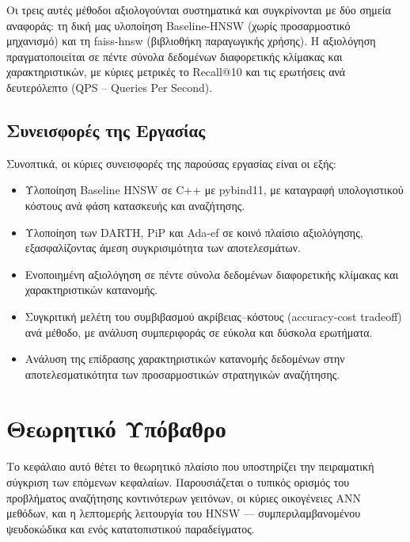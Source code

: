 \documentclass[12pt,a4paper]{article}
\begin{document}
Οι τρεις αυτές μέθοδοι αξιολογούνται συστηματικά και συγκρίνονται με δύο σημεία αναφοράς: τη δική μας υλοποίηση Baseline-HNSW (χωρίς προσαρμοστικό μηχανισμό) και τη faiss-hnsw \cite{faiss2017} (βιβλιοθήκη παραγωγικής χρήσης). Η αξιολόγηση πραγματοποιείται σε πέντε σύνολα δεδομένων διαφορετικής κλίμακας και χαρακτηριστικών, με κύριες μετρικές το Recall@10 και τις ερωτήσεις ανά δευτερόλεπτο (QPS -- Queries Per Second).

\subsection{Συνεισφορές της Εργασίας}
Συνοπτικά, οι κύριες συνεισφορές της παρούσας εργασίας είναι οι εξής:
\begin{itemize}
    \item Υλοποίηση Baseline HNSW σε C++ με pybind11, με καταγραφή υπολογιστικού κόστους ανά φάση κατασκευής και αναζήτησης.
    \item Υλοποίηση των DARTH, PiP και Ada-ef σε κοινό πλαίσιο αξιολόγησης, εξασφαλίζοντας άμεση συγκρισιμότητα των αποτελεσμάτων.
    \item Ενοποιημένη αξιολόγηση σε πέντε σύνολα δεδομένων διαφορετικής κλίμακας και χαρακτηριστικών κατανομής.
    \item Συγκριτική μελέτη του συμβιβασμού ακρίβειας--κόστους (accuracy-cost tradeoff) ανά μέθοδο, με ανάλυση συμπεριφοράς σε εύκολα και δύσκολα ερωτήματα.
    \item Ανάλυση της επίδρασης χαρακτηριστικών κατανομής δεδομένων στην αποτελεσματικότητα των προσαρμοστικών στρατηγικών αναζήτησης.
\end{itemize}

\newpage
\section{Θεωρητικό Υπόβαθρο}
Το κεφάλαιο αυτό θέτει το θεωρητικό πλαίσιο που υποστηρίζει την πειραματική σύγκριση των επόμενων κεφαλαίων. Παρουσιάζεται ο τυπικός ορισμός του προβλήματος αναζήτησης κοντινότερων γειτόνων, οι κύριες οικογένειες ANN μεθόδων, και η λεπτομερής λειτουργία του HNSW --- συμπεριλαμβανομένου ψευδοκώδικα και ενός κατατοπιστικού παραδείγματος.
\end{document}
